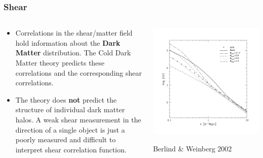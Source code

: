 \documentclass{beamer}
\begin{document}
{
    \frametitle{Shear}
    \fontsize{9}{0.8\baselineskip}

    \begin{columns}
        \begin{column}{0.5\textwidth}
            \begin{itemize}

                \item Correlations in the shear/matter field hold information
                    about the {\bf Dark Matter} distribution.  The Cold Dark
                    Matter theory predicts these correlations and the
                    corresponding shear correlations.

                \item The theory does {\bf not } predict the structure of
                    individual dark matter halos.  A weak shear measurement in
                    the direction of a single object is just a poorly measured
                    and difficult to interpret shear correlation function.

            \end{itemize}
        \end{column}

        \begin{column}{0.5\textwidth}
            \includegraphics[width=\textwidth]{berlind-weinberg-f3.pdf}
            \newline
            \begin{center}
                {\tiny Berlind \& Weinberg 2002}
            \end{center}
        \end{column}
    \end{columns}
}
\end{document}
